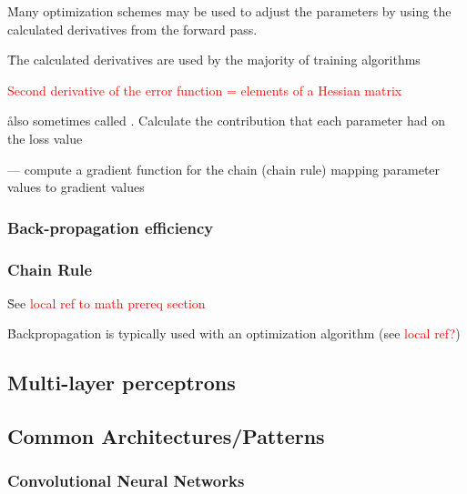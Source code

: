 \r{Many optimization schemes  may be used to adjust the parameters by using the calculated derivatives from the forward pass.}

\r{The calculated derivatives are used by the majority of training algorithms}

\textcolor{red}{Second derivative of the error function = elements of a Hessian matrix}




\r{also sometimes called .  Calculate the contribution that each parameter had on the loss value}

\r{ --- compute a gradient function for the chain (chain rule) mapping parameter values to gradient values}

\subsubsection{Back-propagation efficiency}


\subsubsection{Chain Rule}

\r{See \textcolor{red}{local ref to math prereq section}}


\r{Backpropagation is typically used with an optimization algorithm (see \textcolor{red}{local ref?})}

\subsection{Multi-layer perceptrons}

\subsection{Common Architectures/Patterns}

\subsubsection{Convolutional Neural Networks}


